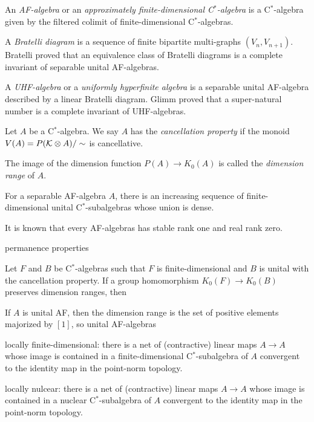 \documentclass{../../large}
\begin{document}
\begin{prb}[AF-algebras]
An \emph{AF-algebra} or an \emph{approximately finite-dimensional C$^*$-algebra} is a C$^*$-algebra given by the filtered colimit of finite-dimensional C$^*$-algebras.

A \emph{Bratelli diagram} is a sequence of finite bipartite multi-graphs $(V_n,V_{n+1})$.
Bratelli proved that an equivalence class of Bratelli diagrams is a complete invariant of separable unital AF-algebras.

A \emph{UHF-algebra} or a \emph{uniformly hyperfinite algebra} is a separable unital AF-algebra described by a linear Bratelli diagram.
Glimm proved that a super-natural number is a complete invariant of UHF-algebras.

Let $A$ be a C$^*$-algebra.
We say $A$ has the \emph{cancellation property} if the monoid $V(A)=P(\mathcal{K}\otimes A)/\sim$ is cancellative.

The image of the dimension function $P(A)\to K_0(A)$ is called the \emph{dimension range} of $A$.
\begin{parts}
\item For a separable AF-algebra $A$, there is an increasing sequence of finite-dimensional unital C$^*$-subalgebras whose union is dense.
\item It is known that every AF-algebras has stable rank one and real rank zero.
\item permanence properties

\item Let $F$ and $B$ be C$^*$-algebras such that $F$ is finite-dimensional and $B$ is unital with the cancellation property. If a group homomorphism $K_0(F)\to K_0(B)$ preserves dimension ranges, then 

If $A$ is unital AF, then the dimension range is the set of positive elements majorized by $[1]$, so unital AF-algebras
\end{parts}
\end{prb}
\begin{pf}
\end{pf}




locally finite-dimensional:
there is a net of (contractive) linear maps $A\to A$ whose image is contained in a finite-dimensional C$^*$-subalgebra of $A$ convergent to the identity map in the point-norm topology.

locally nulcear:
there is a net of (contractive) linear maps $A\to A$ whose image is contained in a nuclear C$^*$-subalgebra of $A$ convergent to the identity map in the point-norm topology.
\end{document}
